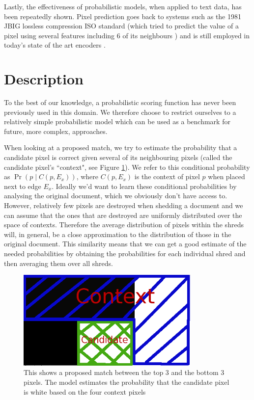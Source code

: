 Lastly, the effectiveness of probabilistic models, when applied to text data, has been repeatedly shown. Pixel prediction goes back to systems such as the 1981 JBIG lossless compression ISO standard (which tried to predict the value of a pixel using several features including 6 of its neighbours \cite{P3}) and is still employed in today's state of the art encoders \cite{P4}. 

\section{Description}

To the best of our knowledge, a probabilistic scoring function has never been previously used in this domain. We therefore choose to restrict ourselves to a relatively simple probabilistic model which can be used as a benchmark for future, more complex, approaches.

When looking at a proposed match, we try to estimate the probability that a candidate pixel is correct given several of its neighbouring pixels (called the candidate pixel's ``context", see Figure \ref{fig:probContext}). We refer to this conditional probability as \(\Pr( p \mid C(p,E_x) )\), where \(C(p,E_x)\) is the context of pixel $p$ when placed next to edge $E_x$. Ideally we'd want to learn these conditional probabilities by analysing the original document, which we obviously don't have access to. However, relatively few pixels are destroyed when shedding a document and we can assume that the ones that are destroyed are uniformly distributed over the space of contexts. Therefore the average distribution of pixels within the shreds will, in general, be a close approximation to the distribution of those in the original document. This similarity means that we can get a good estimate of the needed probabilities by obtaining the probabilities for each individual shred and then averaging them over all shreds.

\begin{figure}[h]
\centering
\includegraphics[width=0.8\textwidth]{context}
\caption{This shows a proposed match between the top 3 and the bottom 3 pixels. The model estimates the probability that the candidate pixel is white based on the four context pixels}
\label{fig:probContext}
\end{figure}

